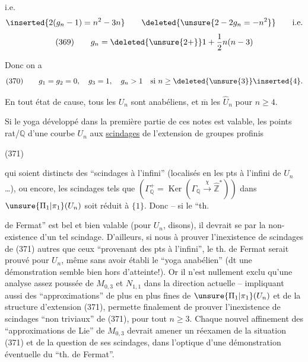 i.e.
\[
\inserted{2(g_n-1)=n^2-3n}
\qquad
\deleted{\unsure{2-2g_n=-n^2}}
\qquad \text{i.e.}
\]
\[
\text{(369)}\qquad g_n=\deleted{\unsure{2+}}1+\frac12 n(n-3)
\]

Donc on a
\[
\text{(370)}\qquad g_1=g_2=0,\quad g_3=1,\quad g_n>1\quad\text{si }n\geq\deleted{\unsure{3}}\inserted{4}.
\]

En tout état de cause, tous les $U_n$ sont anabéliens, et $\overline{\mathrm m}$ les $\widehat U_n$ pour $n\geq4$.

Si le yoga  développé dans la première partie de ces notes est valable, les   points rat/$\mathbb Q$ d'une courbe $U_n$   aux \uline{scindages} de l'extension de groupes profinis

\noindent (371)

qui soient distincts des ``scindages à l'infini'' (localisés en les  pts à l'infini de $U_n$\ldots), ou encore, les scindages tels que  $(\Gamma_{\mathbb Q}^{+}=\operatorname{Ker}(\Gamma_{\mathbb Q}\xrightarrow{\chi}\widehat{\mathbb Z}^{*}))$ dans $\unsure{\Pi_1|\pi_1}(U_n)$ soit réduit à $\{1\}$. Donc -- si le ``th.

de Fermat'' est bel et bien valable (pour $U_n$, disons), il devrait se  par la non-existence d'un tel scindage. D'ailleurs, si nous  à prouver l'inexistence de scindages de (371) autres que ceux ``provenant des pts à l'infini'', le th. de Fermat serait prouvé pour $U_n$, même sans avoir établi le ``yoga anabélien'' (dt une démonstration semble bien hors d'atteinte!). Or il n'est nullement exclu qu'une analyse assez poussée de $M_{0,3}$ et $N_{1,1}$ dans la direction actuelle -- impliquant aussi des ``approximations'' de plus en plus fines de $\unsure{\Pi_1|\pi_1}(U_n)$ et de la structure d'extension (371), permette finalement de prouver l'inexistence de scindages ``non triviaux'' de (371), pour tout $n\geq3$. Chaque nouvel affinement des ``approximations de Lie'' de $M_{0,3}$ devrait amener un réexamen de la situation (371) et de la question de ses scindages, dans l'optique d'une démonstration éventuelle du ``th. de Fermat''.

